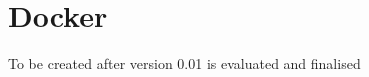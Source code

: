 \documentclass[book,a4paper,12pt]{memoir}
\begin{document}

\chapter{Docker}
\label{cha:docker}
To be created after version 0.01 is evaluated and finalised

\begin{lstlisting}[backgroundcolor = \color{ultralightgray}, language = Python, xleftmargin = 0.1cm, framexleftmargin = 0.3em, showstringspaces=false]

\end{lstlisting}

\backmatter
\end{document}
